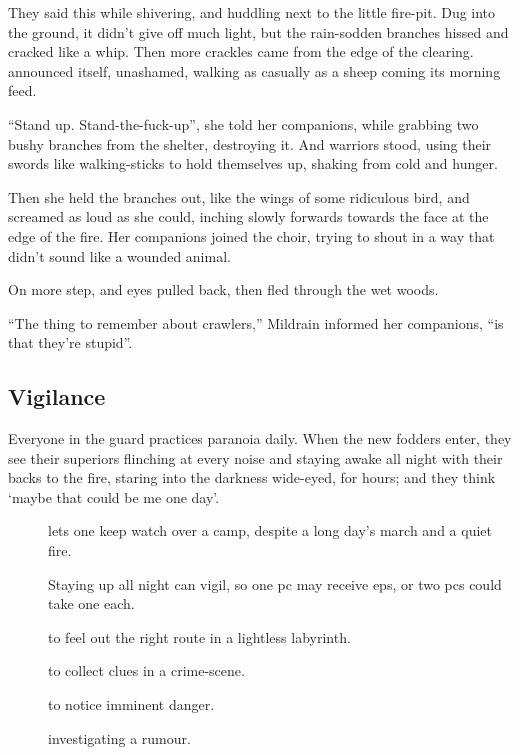 \begin{multicols}{2}
\begin{exampletext}
  They said this while shivering, and huddling next to the little fire-pit.
  Dug into the ground, it didn't give off much light, but the rain-sodden branches hissed and cracked like a whip.
  Then more crackles came from the edge of the clearing.
   announced itself, unashamed, walking as casually as a sheep coming its morning feed.

  ``Stand up.
  Stand-the-fuck-up'', she told her companions, while grabbing two bushy branches from the shelter, destroying it.
  And warriors stood, using their swords like walking-sticks to hold themselves up, shaking from cold and hunger.

  Then she held the branches out, like the wings of some ridiculous bird, and screamed as loud as she could, inching slowly forwards towards the face at the edge of the fire.
  Her companions joined the choir, trying to shout in a way that didn't sound like a wounded animal.

  On more step, and eyes pulled back, then fled through the wet woods.

  ``The thing to remember about \glspl{crawler},''
  Mildrain informed her companions,
  ``is that they're stupid''.

\end{exampletext}

\subsection{Vigilance}

Everyone in the \gls{guard} practices paranoia daily.
When the new \glspl{fodder} enter, they see their superiors flinching at every noise and staying awake all night with their backs to the fire, staring into the darkness wide-eyed, for hours; and they think `maybe that could be me one day'.

\begin{description}
  \item[]
    lets one keep watch over a camp, despite a long day's march and a quiet fire.

    Staying up all night can \glsdesc{vigil}, so one \gls{pc} may receive \glspl{ep}, or two \glspl{pc} could take one each.

  \item[]
    to feel out the right route in a lightless labyrinth.
  \item[]
    to collect clues in a crime-scene.
  \item[]
    to notice imminent danger.
  \item[]
    investigating a rumour.
\end{description}


\end{multicols}
